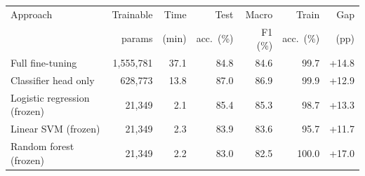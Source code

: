 \begin{tabular}{lrrrrrr}
\toprule
Approach & Trainable & Time & Test & Macro & Train & Gap \\
 & params & (min) & acc.\ (\%) & F1 (\%) & acc.\ (\%) & (pp) \\
\midrule
Full fine-tuning & 1,555,781 & 37.1 & 84.8 & 84.6 & 99.7 & +14.8 \\
Classifier head only & 628,773 & 13.8 & 87.0 & 86.9 & 99.9 & +12.9 \\
Logistic regression (frozen) & 21,349 & 2.1 & 85.4 & 85.3 & 98.7 & +13.3 \\
Linear SVM (frozen) & 21,349 & 2.3 & 83.9 & 83.6 & 95.7 & +11.7 \\
Random forest (frozen) & 21,349 & 2.2 & 83.0 & 82.5 & 100.0 & +17.0 \\
\bottomrule
\end{tabular}